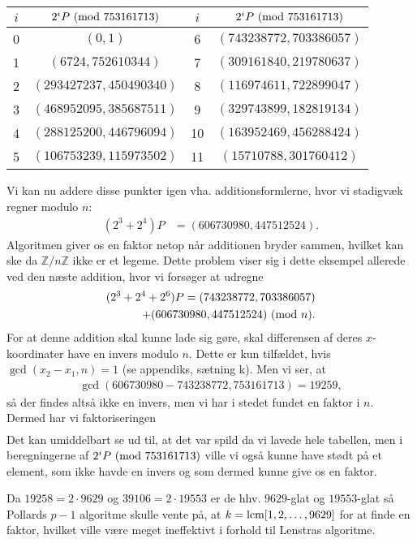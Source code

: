 \begin{example}
\begin{center}
\begin{tabular}{c c c c}
$i$ & $2^i P \ (\mathrm{mod} \ 753161713)$ & $i$ & $2^i P \ (\mathrm{mod} \ 753161713)$ \\ 
\hline 
0 & $(0, 1)$ & 6 & $(743238772, 703386057)$  \\ 
1 & $(6724, 752610344)$ & 7 & $(309161840, 219780637)$  \\ 
2 & $(293427237, 450490340)$ & 8 & $(116974611, 722899047)$ \\ 
3 & $(468952095, 385687511)$ & 9 & $(329743899, 182819134)$ \\ 
4 & $(288125200, 446796094)$ & 10 & $(163952469, 456288424)$ \\ 
5 & $(106753239, 115973502)$ & 11 & $(15710788, 301760412)$
\end{tabular} 
\end{center}
Vi kan nu addere disse punkter igen vha. additionsformlerne, hvor vi stadigvæk regner modulo $n$:
\begin{align*}
	(2^3 + 2^4)P &= (606730980, 447512524). 
\end{align*}
Algoritmen giver os en faktor netop når additionen bryder sammen, hvilket kan ske da $\mathbb{Z}/n \mathbb{Z}$ ikke er et legeme. Dette problem viser sig i dette eksempel allerede ved den næste addition, hvor vi forsøger at udregne
\begin{align*}
	(2^3 + 2^4 + 2^6) P = (743238772, 703386057) \\ + (606730980, 447512524) \ (\mathrm{mod} \ n).
\end{align*}
For at denne addition skal kunne lade sig gøre, skal differensen af deres $x$-koordinater have en invers modulo $n$. Dette er kun tilfældet, hvis $\gcd(x_2 - x_1, n) = 1$ (se appendiks, sætning k). Men vi ser, at
\begin{align*}
	\gcd(606730980 - 743238772, 753161713) = 19259,
\end{align*}
så der findes altså ikke en invers, men vi har i stedet fundet en faktor i $n$. Dermed har vi faktoriseringen
\begin{align*}
\end{align*}
Det kan umiddelbart se ud til, at det var spild da vi lavede hele tabellen, men i beregningerne af $2^i P \ (\mathrm{mod} \ 753161713)$ ville vi også kunne have stødt på et element, som ikke havde en invers og som dermed kunne give os en faktor.
\end{example}

\begin{remark}
Da $19258 = 2 \cdot 9629$ og $39106 = 2 \cdot 19553$ er de hhv. $9629$-glat og $19553$-glat så Pollards $p-1$ algoritme skulle vente på, at $k = \mathrm{lcm}[1, 2, \ldots, 9629]$ for at finde en faktor, hvilket ville være meget ineffektivt i forhold til Lenstras algoritme.
\end{remark}